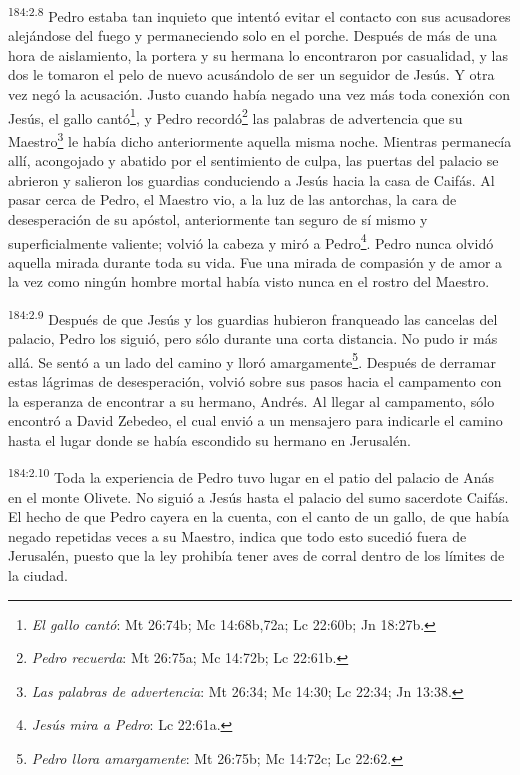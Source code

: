 \par 
\textsuperscript{184:2.8} Pedro estaba tan inquieto que intentó evitar el contacto con sus acusadores alejándose del fuego y permaneciendo solo en el porche. Después de más de una hora de aislamiento, la portera y su hermana lo encontraron por casualidad, y las dos le tomaron el pelo de nuevo acusándolo de ser un seguidor de Jesús. Y otra vez negó la acusación. Justo cuando había negado una vez más toda conexión con Jesús, el gallo cantó\footnote{\textit{El gallo cantó}: Mt 26:74b; Mc 14:68b,72a; Lc 22:60b; Jn 18:27b.}, y Pedro recordó\footnote{\textit{Pedro recuerda}: Mt 26:75a; Mc 14:72b; Lc 22:61b.} las palabras de advertencia que su Maestro\footnote{\textit{Las palabras de advertencia}: Mt 26:34; Mc 14:30; Lc 22:34; Jn 13:38.} le había dicho anteriormente aquella misma noche. Mientras permanecía allí, acongojado y abatido por el sentimiento de culpa, las puertas del palacio se abrieron y salieron los guardias conduciendo a Jesús hacia la casa de Caifás. Al pasar cerca de Pedro, el Maestro vio, a la luz de las antorchas, la cara de desesperación de su apóstol, anteriormente tan seguro de sí mismo y superficialmente valiente; volvió la cabeza y miró a Pedro\footnote{\textit{Jesús mira a Pedro}: Lc 22:61a.}. Pedro nunca olvidó aquella mirada durante toda su vida. Fue una mirada de compasión y de amor a la vez como ningún hombre mortal había visto nunca en el rostro del Maestro.

\par 
\textsuperscript{184:2.9} Después de que Jesús y los guardias hubieron franqueado las cancelas del palacio, Pedro los siguió, pero sólo durante una corta distancia. No pudo ir más allá. Se sentó a un lado del camino y lloró amargamente\footnote{\textit{Pedro llora amargamente}: Mt 26:75b; Mc 14:72c; Lc 22:62.}. Después de derramar estas lágrimas de desesperación, volvió sobre sus pasos hacia el campamento con la esperanza de encontrar a su hermano, Andrés. Al llegar al campamento, sólo encontró a David Zebedeo, el cual envió a un mensajero para indicarle el camino hasta el lugar donde se había escondido su hermano en Jerusalén.

\par 
\textsuperscript{184:2.10} Toda la experiencia de Pedro tuvo lugar en el patio del palacio de Anás en el monte Olivete. No siguió a Jesús hasta el palacio del sumo sacerdote Caifás. El hecho de que Pedro cayera en la cuenta, con el canto de un gallo, de que había negado repetidas veces a su Maestro, indica que todo esto sucedió fuera de Jerusalén, puesto que la ley prohibía tener aves de corral dentro de los límites de la ciudad.

